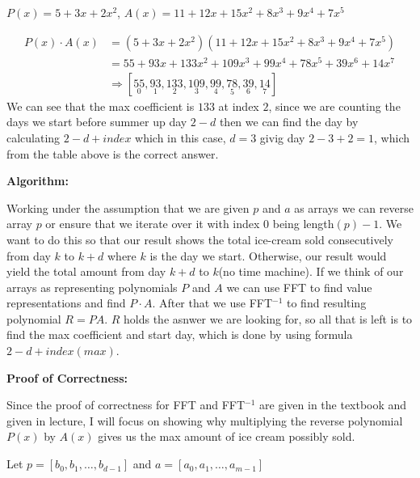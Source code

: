 \documentclass[11pt]{article}
\begin{document}
\begin{solution}
\begin{center}
            $P(x) = 5 + 3x + 2x^2$, $A(x) = 11+12x+15x^2+8x^3+9x^4+7x^5$ \\
        \end{center}    
        \begin{align*}
            P(x)\cdot A(x)&=\left(5 + 3x + 2x^2\right)\left(11+12x+15x^2+8x^3+9x^4+7x^5\right)\\
            &=55 + 93x + 133x^2 + 109x^3 + 99x^4 + 78x^5 + 39x^6 + 14x^7\\
            &\Rightarrow [\underset{0}{55}, \underset{1}{93}, \underset{2}{133}, \underset{3}{109}, \underset{4}{99}, \underset{5}{78}, \underset{6}{39}, \underset{7}{14}]
        \end{align*}
        We can see that the max coefficient is $133$ at index $2$, since we are counting the days we start before summer up day $2-d$ then we can find the 
        day by calculating $2-d + index$ which in this case, $d=3$ givig day $2-3+2=1$, which from the table above is the correct answer.
        \begin{center}
            \textbf{Algorithm: }\\
        \end{center}
        Working under the assumption that we are given $p$ and $a$ as arrays we can reverse array $p$ or ensure that we iterate over it 
        with index 0 being length$(p)-1$. We want to do this so that our result shows the total ice-cream sold consecutively from day 
        $k$ to $k+d$ where $k$ is the day we start. Otherwise, our result would yield the total amount from day $k+d$ to $k$(no time machine). If we think of our
        arrays as representing polynomials $P$ and $A$ we can use FFT to find value representations and find $P\cdot A$. After that we use FFT$^{-1}$ to find resulting polynomial $R = PA$. 
        $R$ holds the asnwer we are looking for, so all that is left is to find the max coefficient and start day, which is done by using formula $2-d + index(max)$.
        \begin{center}
            \textbf{Proof of Correctness: }\\
        \end{center}
        Since the proof of correctness for FFT and FFT$^{-1}$ are given in the textbook and given in lecture, I will focus on showing why 
        multiplying the reverse polynomial $P(x)$ by $A(x)$ gives us the max amount of ice cream possibly sold.
        \begin{center}
            Let $p = [b_0, b_1, \dots, b_{d-1}]$ and $a = [a_0, a_1, \dots, a_{m-1}]$\\

\end{center}
\end{solution}
\end{document}
